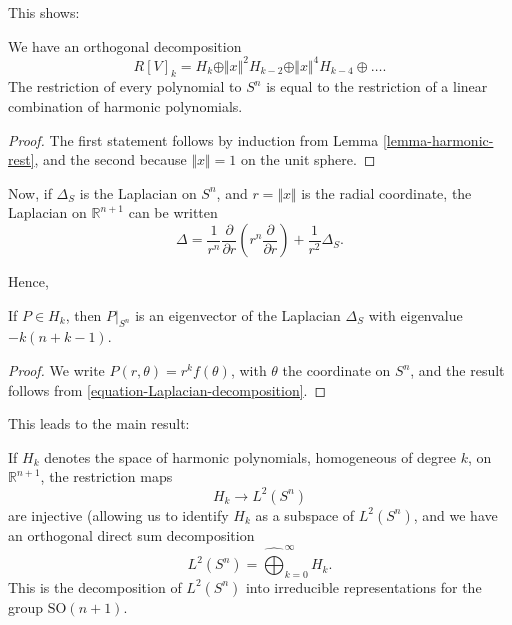This shows:
\begin{proposition}
 \label{proposition-harmonic-ontosphere}
 We have an orthogonal decomposition
 $$ R[V]_k = H_k \oplus \Vert x\Vert^2 H_{k-2} \oplus \Vert x\Vert^4 H_{k-4} \oplus \dots.$$
 The restriction of every polynomial to $S^n$ is equal to the restriction of a linear combination of harmonic polynomials.
\end{proposition}

\begin{proof}
 The first statement follows by induction from Lemma \ref{lemma-harmonic-rest}, and the second because $\Vert x\Vert =1$ on the unit sphere.
\end{proof}

Now, if $\Delta_S$ is the Laplacian on $S^n$, and $r = \Vert x\Vert$ is the radial coordinate, the Laplacian on $\mathbb R^{n+1}$ can be written
\begin{equation}
 \label{equation-Laplacian-decomposition}
 \Delta = \frac{1}{r^n} \frac{\partial}{\partial r} \left(r^n \frac{\partial}{\partial r}\right) + \frac{1}{r^2} \Delta_S.
\end{equation}

Hence, 
\begin{lemma}
 \label{lemma-eigenvalue-sphereLaplacian}
If $P\in H_k$, then $P|_{S^n}$ is an eigenvector of the Laplacian $\Delta_S$ with eigenvalue $-k(n+k-1)$.
\end{lemma}

\begin{proof}
 We write $P (r,\theta) = r^k f(\theta)$, with $\theta$ the coordinate on $S^n$, and the result follows from \eqref{equation-Laplacian-decomposition}.
\end{proof}

This leads to the main result:
\begin{theorem}
 \label{theorem-sphericalharmonics}
If $H_k$ denotes the space of harmonic polynomials, homogeneous of degree $k$, on $\mathbb R^{n+1}$, the restriction maps
$$H_k \to L^2(S^n)$$
are injective (allowing us to identify $H_k$ as a subspace of $L^2(S^n)$, and we have an orthogonal direct sum decomposition 
$$ L^2(S^n) = \hat\bigoplus_{k=0}^\infty H_k.$$
This is the decomposition of $L^2(S^n)$ into irreducible representations for the group $\text{SO}(n+1)$.
\end{theorem}

